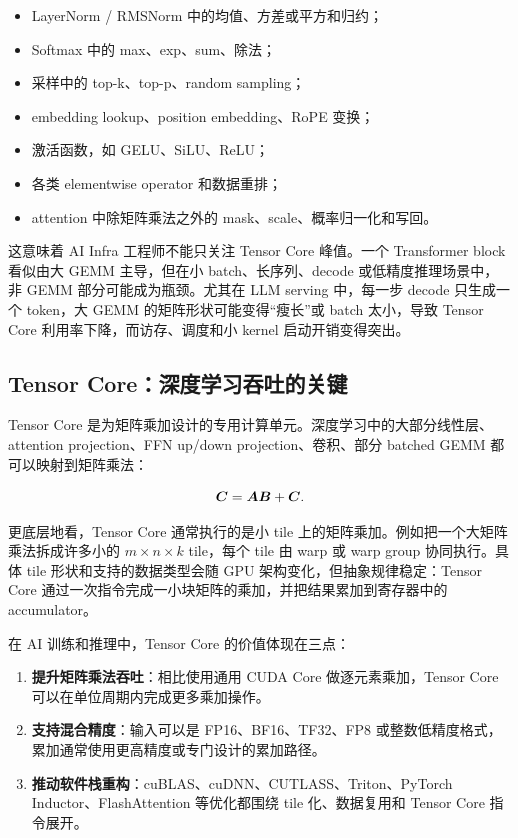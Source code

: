 \begin{itemize}
  \item LayerNorm / RMSNorm 中的均值、方差或平方和归约；
  \item Softmax 中的 max、exp、sum、除法；
  \item 采样中的 top-k、top-p、random sampling；
  \item embedding lookup、position embedding、RoPE 变换；
  \item 激活函数，如 GELU、SiLU、ReLU；
  \item 各类 elementwise operator 和数据重排；
  \item attention 中除矩阵乘法之外的 mask、scale、概率归一化和写回。
\end{itemize}

这意味着 AI Infra 工程师不能只关注 Tensor Core 峰值。一个 Transformer block 看似由大 GEMM 主导，但在小 batch、长序列、decode 或低精度推理场景中，非 GEMM 部分可能成为瓶颈。尤其在 LLM serving 中，每一步 decode 只生成一个 token，大 GEMM 的矩阵形状可能变得“瘦长”或 batch 太小，导致 Tensor Core 利用率下降，而访存、调度和小 kernel 启动开销变得突出。

\subsection{Tensor Core：深度学习吞吐的关键}
\label{subsec:tensor-core}

Tensor Core 是为矩阵乘加设计的专用计算单元。深度学习中的大部分线性层、attention projection、FFN up/down projection、卷积、部分 batched GEMM 都可以映射到矩阵乘法：

\[
  \bm{C} = \bm{A}\bm{B} + \bm{C}.
\]

更底层地看，Tensor Core 通常执行的是小 tile 上的矩阵乘加。例如把一个大矩阵乘法拆成许多小的 $m \times n \times k$ tile，每个 tile 由 warp 或 warp group 协同执行。具体 tile 形状和支持的数据类型会随 GPU 架构变化，但抽象规律稳定：Tensor Core 通过一次指令完成一小块矩阵的乘加，并把结果累加到寄存器中的 accumulator。

在 AI 训练和推理中，Tensor Core 的价值体现在三点：

\begin{enumerate}
  \item \textbf{提升矩阵乘法吞吐}：相比使用通用 CUDA Core 做逐元素乘加，Tensor Core 可以在单位周期内完成更多乘加操作。
  \item \textbf{支持混合精度}：输入可以是 FP16、BF16、TF32、FP8 或整数低精度格式，累加通常使用更高精度或专门设计的累加路径。
  \item \textbf{推动软件栈重构}：cuBLAS、cuDNN、CUTLASS、Triton、PyTorch Inductor、FlashAttention 等优化都围绕 tile 化、数据复用和 Tensor Core 指令展开。
\end{enumerate}

